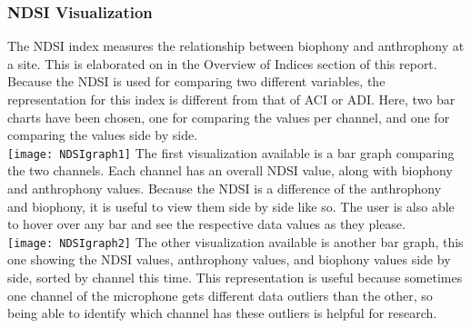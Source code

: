 \subsubsection{NDSI Visualization}
The NDSI index measures the relationship between biophony and anthrophony at a site. This is elaborated on in the Overview of Indices section of this report. Because the NDSI is used for comparing two different variables, the representation for this index is different from that of ACI or ADI. Here, two bar charts have been chosen, one for comparing the values per channel, and one for comparing the values side by side.\\

\texttt{[image: NDSIgraph1]}
The first visualization available is a bar graph comparing the two channels. Each channel has an overall NDSI value, along with biophony and anthrophony values. Because the NDSI is a difference of the anthrophony and biophony, it is useful to view them side by side like so. The user is also able to hover over any bar and see the respective data values as they please.\\

\texttt{[image: NDSIgraph2]}
The other visualization available is another bar graph, this one showing the NDSI values, anthrophony values, and biophony values side by side, sorted by channel this time. This representation is useful because sometimes one channel of the microphone gets different data outliers than the other, so being able to identify which channel has these outliers is helpful for research.

